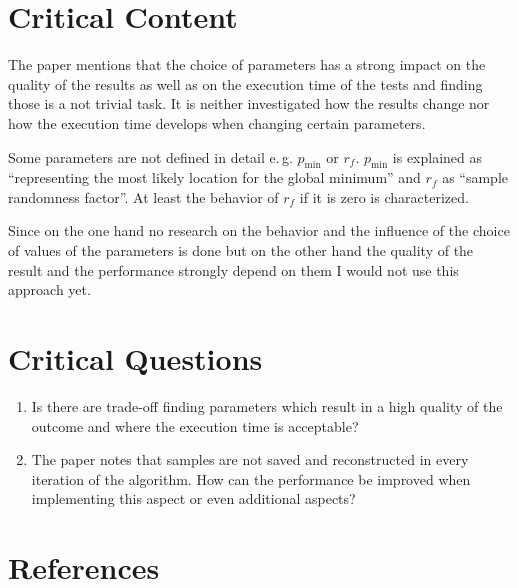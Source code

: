 \documentclass[oneside, notitlepage, twocolumn]{scrartcl}
\newcommand{\eg}{e.\,g.\xspace}
\begin{document}
\section{Critical Content}
The paper mentions that the choice of parameters has a strong impact on the quality of the results as well as on the execution time of the tests and finding those is a not trivial task.
It is neither investigated how the results change nor how the execution time develops when changing certain parameters.\par
Some parameters are not defined in detail \eg{} \(p_\min\) or \(r_f\).
\(p_\min\) is explained as ``representing the most likely location for the global minimum'' and \(r_f\) as ``sample randomness factor''.
At least the behavior of \(r_f\) if it is zero is characterized.\par
Since on the one hand no research on the behavior and the influence of the choice of values of the parameters is done but on the other hand the quality of the result and the performance strongly depend on them I would not use this approach yet.

\section{Critical Questions}
\begin{enumerate}
    \item Is there are trade-off finding parameters which result in a high quality of the outcome and where the execution time is acceptable?
    \item The paper notes that samples are not saved and reconstructed in every iteration of the algorithm.
        How can the performance be improved when implementing this aspect or even additional aspects?
\end{enumerate}

\printglossary[type=\acronymtype, title=List of Abbreviations]

\section{References}
\begingroup
\renewcommand{\section}[2]{}%
\nocite{*}
\printbibliography%
\endgroup
\end{document}
